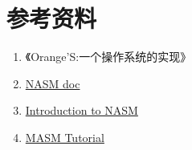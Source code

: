 \documentclass[a4paper]{article}
\begin{document}
\section{参考资料}
	\begin{enumerate}
		\item 《Orange'S:一个操作系统的实现》
		\item \href{http://www.nasm.us/doc/} {NASM doc}
		\item \href{http://jingliu.me/my_files/nasm.pdf}{Introduction to NASM}
		\item \href{http://www.psut.edu.jo/sites/qaralleh/uplab/doc/MASM_Tutorial.pdf}{MASM Tutorial}
	\end{enumerate}



\end{document}
